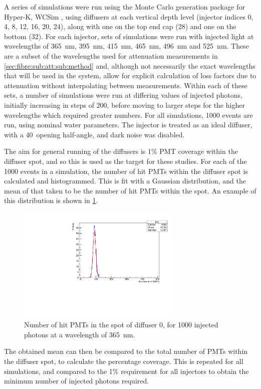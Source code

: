 \documentclass[a4paper,11pt]{article}
\begin{document}
A series of simulations were run using the Monte Carlo generation package for Hyper-K, WCSim \cite{bib:wcsim}, using diffusers at each vertical depth level (injector indices 0, 4, 8, 12, 16, 20, 24), along with one on the top end cap (28) and one on the bottom (32). For each injector, sets of simulations were run with injected light at wavelengths of 365~nm, 395~nm, 415~nm, 465~nm, 496~nm and 525~nm. These are a subset of the wavelengths used for attenuation measurements in \cref{sec:fibre:sub:att:sub:method} and, although not necessarily the exact wavelengths that will be used in the system, allow for explicit calculation of loss factors due to attenuation without interpolating between measurements. Within each of these sets, a number of simulations were run at differing values of injected photons, initially increasing in steps of 200, before moving to larger steps for the higher wavelengths which required greater numbers. For all simulations, 1000 events are run, using nominal water parameters. The injector is treated as an ideal diffuser, with a 40\degree\ opening half-angle, and dark noise was disabled.

The aim for general running of the diffusers is 1\% PMT coverage within the diffuser spot, and so this is used as the target for these studies. For each of the 1000 events in a simulation, the number of hit PMTs within the diffuser spot is calculated and histogrammed. This is fit with a Gaussian distribution, and the mean of that taken to be the number of hit PMTs within the spot. An example of this distribution is shown in \cref{fig:nhits_dif0_365_1000ph_plot}.
\begin{figure}[h]
\centering
\includegraphics[width=0.7\textwidth]{nhits_dif0_365_1000ph_plot.pdf}
\caption{Number of hit PMTs in the spot of diffuser 0, for 1000 injected photons at a wavelength of 365~nm.}\label{fig:nhits_dif0_365_1000ph_plot}
\end{figure}
The obtained mean can then be compared to the total number of PMTs within the diffuser spot, to calculate the percentage coverage. This is repeated for all simulations, and compared to the 1\% requirement for all injectors to obtain the minimum number of injected photons required.
\end{document}
